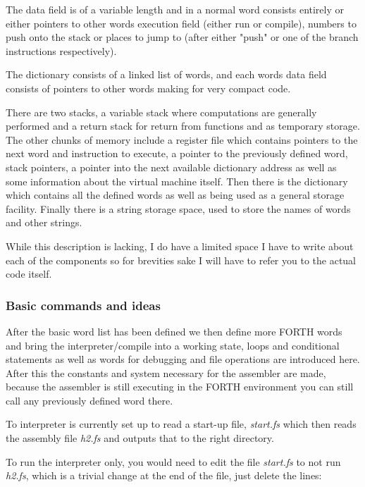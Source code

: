 \documentclass	[a4paper, 10pt]	{article}
\begin{document}
      The data field is of a variable length and in a normal word consists entirely or
      either pointers to other words execution field (either run or compile), numbers
      to push onto the stack or places to jump to (after either "push" or one of the
      branch instructions respectively).

      The dictionary consists of a linked list of words, and each words data field
      consists of pointers to other words making for very compact code.

      There are two stacks, a variable stack where computations are generally performed
      and a return stack for return from functions and as temporary storage. The other
      chunks of memory include a register file which contains pointers to the next
      word and instruction to execute, a pointer to the previously defined word, stack
      pointers, a pointer into the next available dictionary address as well as some
      information about the virtual machine itself. Then there is the dictionary which
      contains all the defined words as well as being used as a general storage facility.
      Finally there is a string storage space, used to store the names of words and
      other strings.

      While this description is lacking, I do have a limited space I have to write about
      each of the components so for brevities sake I will have to refer you to the
      actual code itself.
       
      \subsubsection{Basic commands and ideas}

      After the basic word list has been defined we then define more FORTH words and
      bring the interpreter/compile into a working state, loops and conditional
      statements as well as words for debugging and file operations are introduced
      here. After this the constants and system necessary for the assembler are made,
      because the assembler is still executing in the FORTH environment you can still
      call any previously defined word there.

      To interpreter is currently set up to read a start-up file, \emph{start.fs}
      which then reads the assembly file \emph{h2.fs} and outputs that to the right
      directory.

      To run the interpreter only, you would need to edit the file \emph{start.fs}
      to not run \emph{h2.fs}, which is a trivial change at the end of the file,
      just delete the lines:
\end{document}
